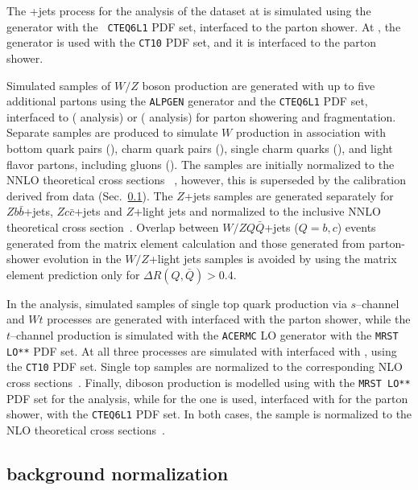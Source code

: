 The \ttbar{}+jets process for the analysis of the dataset at
\seventev{} is simulated using the \alpgen{} generator with the {\tt
  CTEQ6L1} PDF set, interfaced to the \herwig{} parton shower.  
At \eighttev{}, the \powheg{} generator is used with the {\tt CT10}
PDF set, and it is interfaced to the \pythia{} parton shower. 

Simulated samples of $W/Z$ boson production are generated with up to
five additional partons using the {\tt ALPGEN} generator and the
{\tt CTEQ6L1} PDF set, interfaced to \herwig{} (\seventev{} analysis) or
\pythia{} (\eighttev{} analysis) for parton showering and fragmentation. 
Separate samples are produced to simulate $W$ production in
association with bottom quark pairs (\wbb{}), charm quark
pairs (\wcc{}), single charm quarks (\wc{}), and light
flavor partons, including gluons (\wlight{}). The samples are initially
normalized to the NNLO theoretical cross sections ~\cite{vjetsxs},
however, this is superseded by the calibration derived from data
(Sec.~\ref{sec:wjets}).
The $Z$+jets samples are generated separately for $Zb\bar{b}$+jets,
$Zc\bar{c}$+jets and $Z$+light jets and normalized to the inclusive
NNLO theoretical cross section~\cite{vjetsxs}.
Overlap between $W/ZQ\bar{Q}$+jets ($Q=b,c$) events generated from the
matrix element calculation and those generated from parton-shower
evolution in the $W/Z$+light jets samples is avoided by using the
matrix element prediction only for $\Delta R(Q,\bar{Q})>0.4$.

In the \seventev{} analysis, simulated samples of single top quark
production via $s$--channel and $Wt$ processes are generated with
\mcatnlo{} interfaced with the \herwig{} parton shower, while the
$t$--channel production is simulated with the {\tt ACERMC} LO
generator with the {\tt MRST LO**} PDF set.
At \eighttev{} all three processes are simulated with \powheg{}
interfaced with \pythia{}, using the {\tt CT10} PDF set.
Single top samples are normalized to the corresponding NLO cross
sections~\cite{stschan,sttchan,stwt}. 
Finally, diboson production is modelled using \herwig{} with
the {\tt MRST LO**} PDF set for the \seventev{} analysis, while for
the \eighttev{} one \alpgen{} is used, interfaced with \herwig{} for
the parton shower, with the {\tt CTEQ6L1} PDF set. In both cases, the
sample is normalized to the NLO theoretical cross
sections~\cite{dibosonxs}.

\subsection{\wjets{} background normalization}
\label{sec:wjets}

